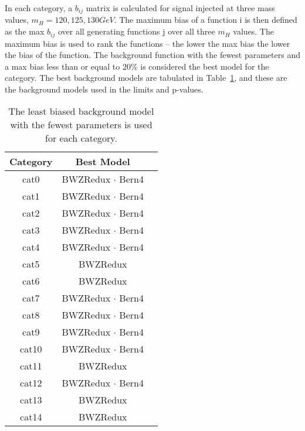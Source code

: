 In each category, a $b_{ij}$ matrix is calculated for signal injected at three mass values, $m_H = 120, 125, 130 GeV$. The maximum bias of a function i is then defined as the max $b_{ij}$ over all generating functions j over all three $m_H$ values. The maximum bias is used to rank the functions -- the lower the max bias the lower the bias of the function. The background function with the fewest parameters and a max bias less than or equal to $20\%$ is considered the best model for the category. The best background models are tabulated in Table~\ref{tab:bias}, and these are the background models used in the limits and p-values. 
\begin{table}[h!]
    \centering
    \caption[The background model for each category.]{The least biased background model with the fewest parameters is used for each category.}
    \label{tab:bias}
    \begin{tabular}{ccc}
        \hline
        Category & Best Model           \\
        \hline
        cat0  & BWZRedux $\cdot$ Bern4  \\
        cat1  & BWZRedux $\cdot$ Bern4  \\
        cat2  & BWZRedux $\cdot$ Bern4  \\
        cat3  & BWZRedux $\cdot$ Bern4  \\
        cat4  & BWZRedux $\cdot$ Bern4  \\
        cat5  & BWZRedux                \\
        cat6  & BWZRedux                \\
        cat7  & BWZRedux $\cdot$ Bern4  \\
        cat8  & BWZRedux $\cdot$ Bern4  \\
        cat9  & BWZRedux $\cdot$ Bern4  \\
        cat10 & BWZRedux $\cdot$ Bern4  \\
        cat11 & BWZRedux                \\
        cat12 & BWZRedux $\cdot$ Bern4  \\
        cat13 & BWZRedux                \\
        cat14 & BWZRedux                \\
        \hline
    \end{tabular}
\end{table}

